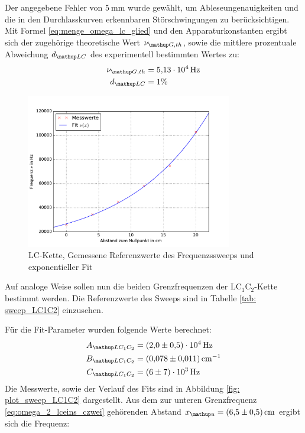 Der angegebene Fehler von $\SI{5}{\milli\meter}$ wurde gewählt, um Ableseungenauigkeiten und die in den Durchlasskurven
erkennbaren Störschwingungen zu berücksichtigen.
Mit Formel \eqref{eq:menge_omega_lc_glied} und den Apparaturkonstanten ergibt sich der zugehörige theoretische Wert $\nu\ua{G, th}$, sowie die
mittlere prozentuale Abweichung $d\ua{LC}$ des experimentell bestimmten Wertes zu:
\begin{align}
  \nu\ua{G, th} &= \SI{5.13e4}{\hertz} \\
  d\ua{LC} &= 1 \%
\end{align}
\FloatBarrier
\begin{figure}
  \centering
  \includegraphics[width = 0.8\textwidth]{../Messdaten/plots/frequenzsweep_LC.pdf}
  \caption{LC-Kette, Gemessene Referenzwerte des Frequenzssweeps und exponentieller Fit}
  \label{fig: plot_sweep_LC}
\end{figure}
Auf analoge Weise sollen nun die beiden Grenzfrequenzen der $\mathup{LC_1C_2}$-Kette bestimmt werden. Die Referenzwerte
des Sweeps sind in Tabelle \ref{tab: sweep_LC1C2} einzusehen.
\FloatBarrier

Für die Fit-Parameter wurden folgende Werte berechnet:
\begin{align}
  \begin{aligned}
    A\ua{LC_1C_2} &= \SI{2.0(5)e4}{\hertz}\\
    B\ua{LC_1C_2} &= \SI{0.078(11)}{\cm^{-1}}\\
    C\ua{LC_1C_2} &= \SI{6(7)e3}{\hertz}
  \end{aligned}
  \label{eq: params_LC1C2}
\end{align}
Die Messwerte, sowie der Verlauf des Fits sind in Abbildung \ref{fig: plot_sweep_LC1C2} dargestellt.
Aus dem zur unteren Grenzfrequenz \eqref{eq:omega_2_lceins_czwei} gehörenden Abstand $x\ua{u} = \SI{6.5(5)}{\cm}$ ergibt sich die Frequenz:
